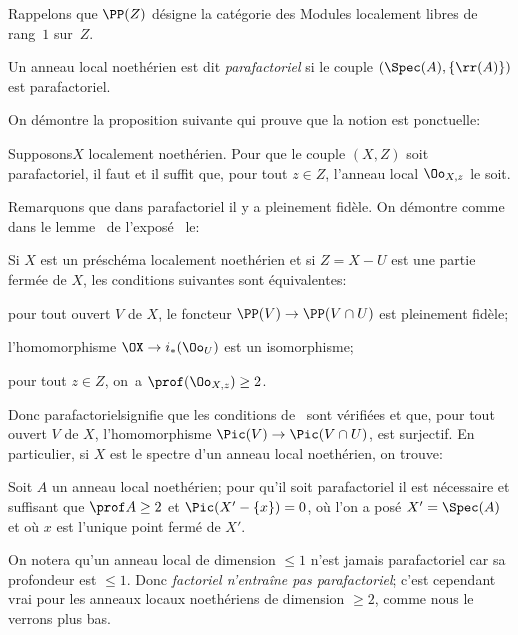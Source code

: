 Rappelons que $\PP(Z)$ d\'esigne la cat\'egorie des Modules localement libres de rang~$1$ sur~$Z$.

\begin{definition} \label{XI.3.2}
Un anneau local noeth\'erien est dit \emph{parafactoriel} si le couple $(\Spec(A), \{\rr(A)\})$ est parafactoriel.
\end{definition}

On d\'emontre la proposition suivante qui prouve que la notion est \og ponctuelle\fg:

\begin{proposition} \label{XI.3.3}
Supposons\pageoriginale $X$ localement noeth\'erien. Pour que le couple $(X, Z)$ soit parafactoriel, il faut et il suffit que, pour tout $z\in Z$, l'anneau local $\Oo_{X, z}$ le soit.
\end{proposition}

Remarquons que dans parafactoriel il y a \og pleinement fid\`ele\fg. On d\'emontre comme dans le lemme~ de l'expos\'e~ le:

\begin{lemme} \label{XI.3.4}
Si $X$ est un pr\'esch\'ema localement noeth\'erien et si $Z=X-U$ est une partie ferm\'ee de $X$, les conditions suivantes sont \'equivalentes:
\begin{enumeratei}
\item
pour tout ouvert $V$ de $X$, le foncteur $\PP(V)\to \PP(V\cap U)$ est pleinement fid\`ele;
\item
l'homomorphisme $\OX \to i_*(\Oo_U)$ est un isomorphisme;
\item
pour tout $z\in Z$, on~a $\prof(\Oo_{X, z})\geq 2$.
\end{enumeratei}
\end{lemme}

Donc \og parafactoriel\fg signifie que les conditions de~ sont v\'erifi\'ees et que, pour tout ouvert $V$ de $X$, l'homomorphisme $\Pic(V)\to\Pic(V\cap U)$, est surjectif. En particulier, si $X$ est le spectre d'un anneau local noeth\'erien, on trouve:

\begin{proposition} \label{XI.3.5}
Soit $A$ un anneau local noeth\'erien; pour qu'il soit parafactoriel il est n\'ecessaire et suffisant que $\prof A\geq 2$ et $\Pic(X'-\{x\})=0$, o\`u l'on a pos\'e $X'=\Spec(A)$ et o\`u $x$ est l'unique point ferm\'e de $X'$.
\end{proposition}

On notera qu'un anneau local de dimension $\leq 1$ n'est jamais parafactoriel car sa profondeur est $\leq 1$. Donc \emph{factoriel n'entra\^ine pas parafactoriel}; c'est cependant vrai pour les anneaux locaux noeth\'eriens de dimension $\geq 2$, comme nous le verrons plus bas.

